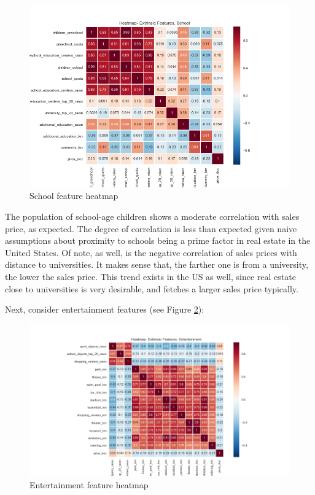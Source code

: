 \documentclass[12pt]{article}
\theoremstyle{plain} %
\theoremstyle{definition} %
\theoremstyle{remark} %
\begin{document}
\begin{figure}[h!]
\begin{center}
\includegraphics[width=15cm]{./output_images/school_heatmap.png}
\caption{School feature heatmap}
\label{fig:nine}
\end{center}
\end{figure}

The population of school-age children shows a moderate correlation with sales price, as expected. The degree of correlation is less than expected given naive assumptions about proximity to schools being a prime factor in real estate in the United States.  Of note, as well, is the negative correlation of sales prices with distance to universities.  It makes sense that, the farther one is from a university, the lower the sales price.  This trend exists in the US as well, since real estate close to universities is very desirable, and fetches a larger sales price typically.

Next, consider entertainment features (see Figure \ref{fig:ten}):

\begin{figure}[h!]
\begin{center}
\includegraphics[width=15cm]{./output_images/entertainment_heatmap.png}
\caption{Entertainment feature heatmap}
\label{fig:ten}
\end{center}
\end{figure}
\end{document}
